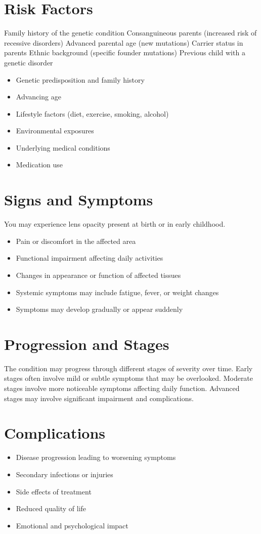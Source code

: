 \section{Risk Factors}
Family history of the genetic condition Consanguineous parents (increased risk of recessive disorders) Advanced parental age (new mutations) Carrier status in parents Ethnic background (specific founder mutations) Previous child with a genetic disorder

\begin{itemize}[noitemsep]
  \item Genetic predisposition and family history
  \item Advancing age
  \item Lifestyle factors (diet, exercise, smoking, alcohol)
  \item Environmental exposures
  \item Underlying medical conditions
  \item Medication use
\end{itemize}
\section{Signs and Symptoms}
You may experience lens opacity present at birth or in early childhood.

\begin{itemize}[noitemsep]
  \item Pain or discomfort in the affected area
  \item Functional impairment affecting daily activities
  \item Changes in appearance or function of affected tissues
  \item Systemic symptoms may include fatigue, fever, or weight changes
  \item Symptoms may develop gradually or appear suddenly
\end{itemize}
\section{Progression and Stages}
The condition may progress through different stages of severity over time. Early stages often involve mild or subtle symptoms that may be overlooked. Moderate stages involve more noticeable symptoms affecting daily function. Advanced stages may involve significant impairment and complications.
\section{Complications}
\begin{itemize}[noitemsep]
  \item Disease progression leading to worsening symptoms
  \item Secondary infections or injuries
  \item Side effects of treatment
  \item Reduced quality of life
  \item Emotional and psychological impact
\end{itemize}
